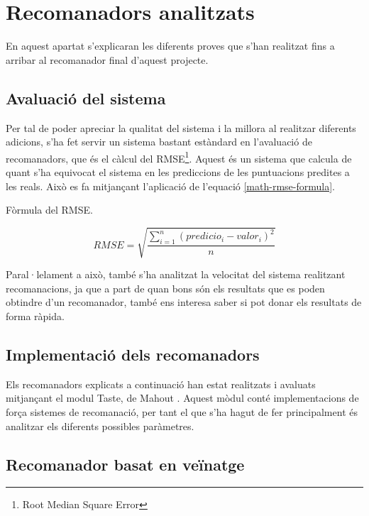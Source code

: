 \chapter{Recomanadors analitzats}

En aquest apartat s'explicaran les diferents proves que s'han realitzat fins a arribar al recomanador final d'aquest projecte.

\section{Avaluació del sistema}

Per tal de poder apreciar la qualitat del sistema i la millora al realitzar diferents adicions, s'ha fet servir un sistema bastant estàndard en l'avaluació de recomanadors, que és el càlcul del RMSE\footnote{Root Median Square Error}. Aquest és un sistema que calcula de quant s'ha equivocat el sistema en les prediccions de les puntuacions predites a les reals. Això es fa mitjançant l'aplicació de l'equació \ref{math-rmse-formula}.

\begin{mycapequ}[h]
\caption{Fòrmula del RMSE.}
\label{math-rmse-formula}
\begin{equation}
RMSE=\sqrt{\frac{\sum_{i=1}^{n}{(predicio_i - valor_i)}^2}{n}}
\end{equation}
\end{mycapequ}

Paral·lelament a això, també s'ha analitzat la velocitat del sistema realitzant recomanacions, ja que a part de quan bons són els resultats que es poden obtindre d'un recomanador, també ens interesa saber si pot donar els resultats de forma ràpida.

\section{Implementació dels recomanadors}

Els recomanadors explicats a continuació han estat realitzats i avaluats mitjançant el modul Taste, de Mahout \cite{Apache-Mahout}. Aquest mòdul conté implementacions de força sistemes de recomanació, per tant el que s'ha hagut de fer principalment és analitzar els diferents possibles paràmetres.


\section{Recomanador basat en veïnatge}

